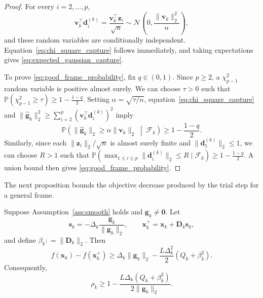 \documentclass{siamart171218}
\newcommand{\bx}{\bm{x}}
\newcommand{\bd}{\bm{d}}
\newcommand{\bg}{\bm{g}}
\newcommand{\bz}{\bm{z}}
\newcommand{\bs}{\bm{s}}
\providecommand{\coloneqq}{\mathrel{\mathop:}=}
\begin{document}
\begin{proof}
For every $i=2,\ldots,p$,
\[
\bm v_k^\top\bd_i^{(k)} = \frac{\bm v_k^\top\bz_i}{\sqrt n} \sim \mathcal N \left( 0, \frac{\|\bm v_k\|_2^2}{n} \right),
\]
and these random variables are conditionally independent. Equation~\eqref{eq:chi_square_capture} follows immediately, and taking expectations gives \eqref{eq:expected_gaussian_capture}.

To prove \eqref{eq:good_frame_probability}, fix $q\in(0,1)$. Since $p\ge 2$, a $\chi^2_{p-1}$ random variable is positive almost surely. We can choose $\tau>0$ such that $\mathbb P(\chi^2_{p-1}\ge\tau) \ge 1 - \frac{1-q}{2}$. Setting $\alpha=\sqrt{\tau/n}$, equation~\eqref{eq:chi_square_capture} and $\|\hat{\bg}_k\|_2^2 \ge \sum_{i=2}^p (\bm v_k^\top\bd_i^{(k)})^2$ imply
\[
\mathbb P\left( \|\hat{\bg}_k\|_2 \ge \alpha\|\bm v_k\|_2 \;\middle|\; \mathcal F_k \right) \ge 1 - \frac{1-q}{2}.
\]
Similarly, since each $\|\bz_i\|_2/\sqrt n$ is almost surely finite and $\|\bd_1^{(k)}\|_2 \le 1$, we can choose $R>1$ such that $\mathbb P(\max_{1\le i\le p}\|\bd_i^{(k)}\|_2 \le R \mid \mathcal F_k) \ge 1 - \frac{1-q}{2}$. A union bound then gives \eqref{eq:good_frame_probability}.
\end{proof}

The next proposition bounds the objective decrease produced by the trial step for a general frame.

\begin{proposition}
\label{prop:general_descent}
\label{prop:descent}
Suppose Assumption~\ref{ass:smooth} holds and $\bg_k\ne\bm0$. Let
\[
\bs_k = -\Delta_k \frac{\bg_k}{\|\bg_k\|_2}, \qquad \bx_k^+ = \bx_k+\bm D_k\bs_k,
\]
and define $\beta_k \coloneqq \|\bm D_k\|_2$. Then
\begin{equation}
\label{eq:general_decrease}
f(\bx_k)-f(\bx_k^+) \ge \Delta_k\|\bg_k\|_2 - \frac{L\Delta_k^2}{2} (Q_k+\beta_k^2).
\end{equation}
Consequently,
\begin{equation}
\label{eq:general_ratio}
\rho_k \ge 1 - \frac{L\Delta_k(Q_k+\beta_k^2)}{2\|\bg_k\|_2}.
\end{equation}
\end{proposition}
\end{document}

